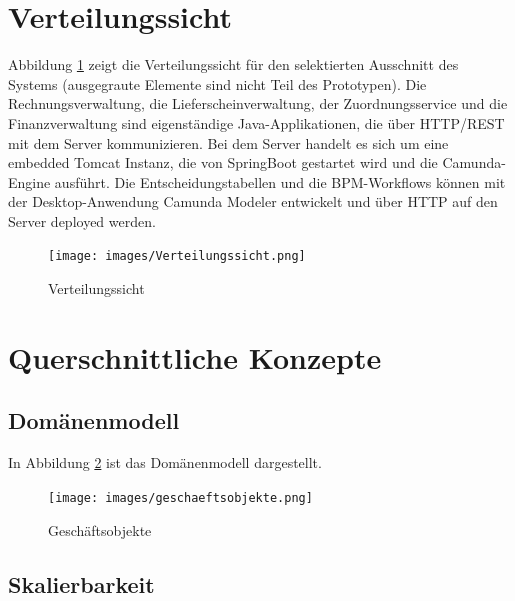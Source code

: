 \section{Verteilungssicht}\label{section-deployment-view}

Abbildung \ref{fig:Verteilungssicht} zeigt die Verteilungssicht für den selektierten Ausschnitt des Systems (ausgegraute Elemente sind nicht Teil des Prototypen). Die Rechnungsverwaltung, die Lieferscheinverwaltung, der Zuordnungsservice und die Finanzverwaltung sind eigenständige Java-Applikationen, die über HTTP/REST mit dem Server kommunizieren. Bei dem Server handelt es sich um eine embedded Tomcat Instanz, die von SpringBoot gestartet wird und die Camunda-Engine ausführt. Die Entscheidungstabellen und die BPM-Workflows können mit der Desktop-Anwendung Camunda Modeler entwickelt und über HTTP auf den Server deployed werden.

\begin{figure}
  \centering
  \texttt{[image: images/Verteilungssicht.png]}
  \caption{Verteilungssicht}
  \label{fig:Verteilungssicht}
\end{figure}

\section{Querschnittliche Konzepte}\label{section-concepts}

\subsection{Domänenmodell}

In Abbildung \ref{fig:geschaeftsobjekte} ist das Domänenmodell dargestellt.

\begin{figure}
  \centering
  \texttt{[image: images/geschaeftsobjekte.png]}
  \caption{Geschäftsobjekte}
  \label{fig:geschaeftsobjekte}
\end{figure}

\subsection{Skalierbarkeit}

